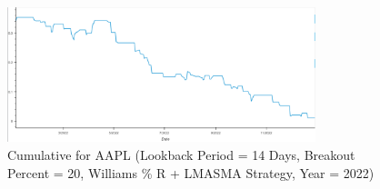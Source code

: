 \begin{figure}[h!]
\centering
\includegraphics[width=0.8\textwidth]{Images/apple_williams_lma__2.png}
\caption{Cumulative for AAPL (Lookback Period = 14 Days, Breakout Percent = 20, Williams \% R + LMASMA Strategy, Year = 2022)}
\label{fig:entryexit1}
\end{figure}
